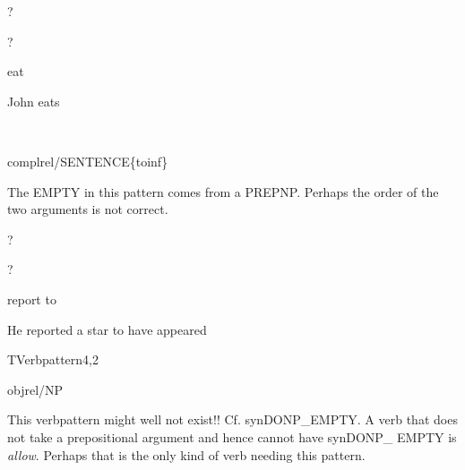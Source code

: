 \begin{thetadescr}
\evitem ?
\esitem
     \begin{examples}
        \example  ?
     \end{examples}
\end{thetadescr}



\begin{thetadescr}
\evitem eat
\esitem
     \begin{examples}
        \example John eats
     \end{examples}
\end{thetadescr}


\newpage
{}
\begin{vpattern}
 \norule
\csritem \mbox{}\\
     \begin{csr}
       complrel/SENTENCE\{toinf\} 
     \end{csr}
\remarksitem The EMPTY in this pattern comes from a PREPNP. Perhaps the order 
of the two arguments is not correct.
\end{vpattern}


\begin{thetadescr}
\evitem ?
\esitem
     \begin{examples}
        \example  ?
     \end{examples}
\end{thetadescr}



\begin{thetadescr}
\evitem  report to
\esitem
     \begin{examples}
        \example He reported a star to have appeared
     \end{examples}
\end{thetadescr}


\newpage
{}
\begin{vpattern}
 TVerbpattern4,2   
\csritem \mbox{}\\
     \begin{csr}
     objrel/NP
     \end{csr}
\remarksitem This verbpattern might well not exist!! Cf. synDONP\_EMPTY. A verb 
that does not take a prepositional argument and hence cannot have 
synDONP\_
EMPTY is {\em allow\/}. Perhaps that is the only kind of verb needing 
this pattern.
\end{vpattern}

